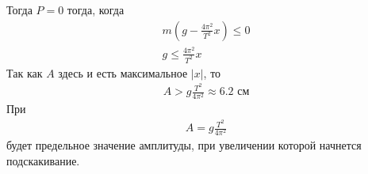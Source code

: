 \documentclass[a5paper,10pt]{article}
\begin{document}
Тогда $P=0$ тогда, когда 
\begin{gather*}
    {}m(g-\frac{4\pi^2}{T^2}x)\leq{0}\\
    g\leq{\frac{4\pi^2}{T^2}x}
\end{gather*}
Так как $A$ здесь и есть максимальное $|x|$, то 
\begin{gather*}
    A>{g\frac{T^2}{4\pi^2}}\approx6.2\text{ см}
\end{gather*}
При 
\begin{gather*}
    A={g\frac{T^2}{4\pi^2}}
\end{gather*}
будет предельное значение амплитуды, при увеличении которой начнется подскакивание.
\end{document}
